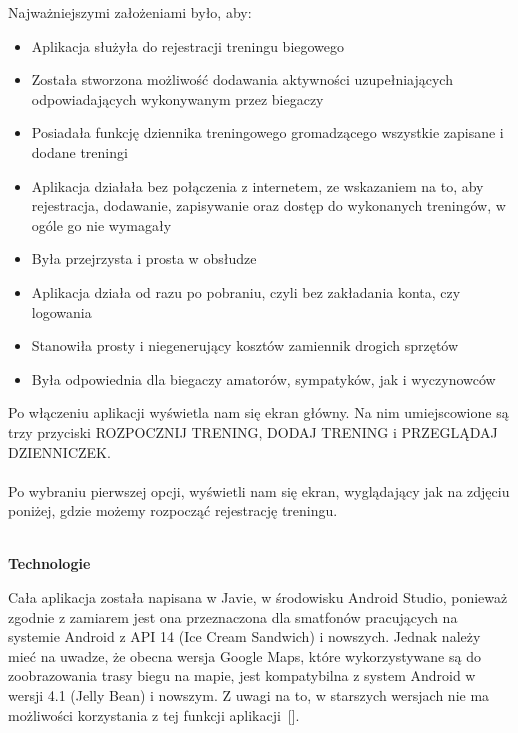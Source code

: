 \documentclass[a4paper,12pt,reqno]{article}
\begin{document}
Najważniejszymi założeniami było, aby:
\begin{itemize}
	\item Aplikacja służyła do rejestracji treningu biegowego
	\item Została stworzona możliwość dodawania aktywności uzupełniających odpowiadających wykonywanym przez biegaczy
	\item Posiadała funkcję dziennika treningowego gromadzącego wszystkie zapisane i dodane treningi
	\item Aplikacja działała bez połączenia z internetem, ze wskazaniem na to, aby rejestracja, dodawanie, zapisywanie oraz dostęp do wykonanych treningów, w ogóle go nie wymagały
	\item Była przejrzysta i prosta w obsłudze
	\item Aplikacja działa od razu po pobraniu, czyli bez zakładania konta, czy logowania
	\item Stanowiła prosty i niegenerujący kosztów zamiennik drogich sprzętów
	\item Była odpowiednia dla biegaczy amatorów, sympatyków, jak i wyczynowców	
\end{itemize}

Po włączeniu aplikacji wyświetla nam się ekran główny. Na nim umiejscowione są trzy przyciski ROZPOCZNIJ TRENING, DODAJ TRENING i PRZEGLĄDAJ DZIENNICZEK.\\
[TU BĘDZIE ZDJĘCIE]
\\

Po wybraniu pierwszej opcji, wyświetli nam się ekran, wyglądający jak na zdjęciu poniżej, gdzie możemy rozpocząć rejestrację treningu.\\
[TU WSTAW ZDJĘCIA]
\\

\newpage

\begin{flushleft}
	\Large \textbf{Technologie}
\end{flushleft}
\vspace{1cm}

Cała aplikacja została napisana w Javie, w środowisku Android Studio, ponieważ zgodnie z zamiarem jest ona przeznaczona dla smatfonów pracujących na systemie Android z API 14 (Ice Cream Sandwich) i nowszych. Jednak należy mieć na uwadze, że obecna wersja Google Maps, które wykorzystywane są do zoobrazowania trasy biegu na mapie, jest kompatybilna z system Android w wersji 4.1 (Jelly Bean) i nowszym. Z uwagi na to, w starszych wersjach nie ma możliwości korzystania z tej funkcji aplikacji~[].\\
\end{document}
